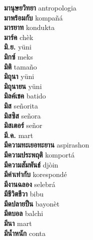 \textbf{ มานุษยวิทยา  } antropologia \\
\textbf{ มาพร้อมกับ  } kompañá \\
\textbf{ มารยาท  } kondukta \\
\textbf{ มาร์ค  } chèk \\
\textbf{ มิ.ย.  } yüni \\
\textbf{ มิกซ์  } meks \\
\textbf{ มิติ  } tamaño \\
\textbf{ มิถุนา  } yüni \\
\textbf{ มิถุนายน  } yüni \\
\textbf{ มิลค์เชค  } batido \\
\textbf{ มิส  } señorita \\
\textbf{ มิสซิส  } señora \\
\textbf{ มิสเตอร์  } señor \\
\textbf{ มี.ค.  } mart \\
\textbf{ มีความทะเยอทะยาน  } aspirashon \\
\textbf{ มีความประพฤติ  } komportá \\
\textbf{ มีความสัมพันธ์  } djòin \\
\textbf{ มีค่าเท่ากับ  } korespondé \\
\textbf{ มีงานฉลอง  } selebrá \\
\textbf{ มีชีวิตชีวา  } bibu \\
\textbf{ มีดปลายปืน  } bayonèt \\
\textbf{ มีตบอล  } balchi \\
\textbf{ มีนา  } mart \\
\textbf{ มีน้ำหนัก  } conta \\

